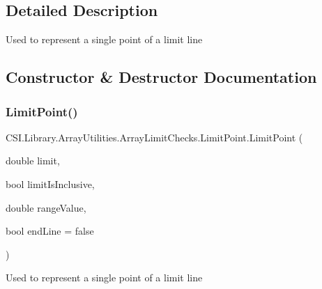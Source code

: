 \subsection{Detailed Description}
Used to represent a single point of a limit line 



\subsection{Constructor \& Destructor Documentation}
\mbox{\label{class_c_s_i_1_1_library_1_1_array_utilities_1_1_array_limit_checks_1_1_limit_point_a6a7bedf82a8e1015308acc9afb835512}} 
\subsubsection{\texorpdfstring{LimitPoint()}{LimitPoint()}\hspace{0.1cm}{\footnotesize\ttfamily [1/2]}}
{\footnotesize\ttfamily C\+S\+I.\+Library.\+Array\+Utilities.\+Array\+Limit\+Checks.\+Limit\+Point.\+Limit\+Point (\begin{DoxyParamCaption}\item[{double}]{limit,  }\item[{bool}]{limit\+Is\+Inclusive,  }\item[{double}]{range\+Value,  }\item[{bool}]{end\+Line = {\ttfamily false} }\end{DoxyParamCaption})\hspace{0.3cm}{\ttfamily [inline]}}



Used to represent a single point of a limit line 


